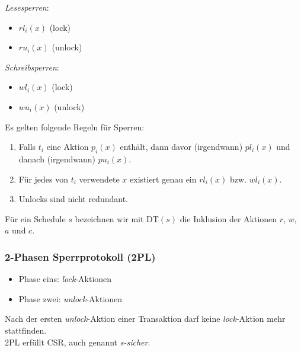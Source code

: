 \documentclass[a4paper,parskip=half*,DIV=15,fontsize=11pt]{scrartcl}
\begin{document}
\begin{minipage}[t]{0.5\textwidth}
\begin{center}
\emph{Lesesperren}:
\begin{itemize}
\item $rl_i(x)$ (lock)
\item $ru_i(x)$ (unlock)
\end{itemize}
\end{center}
\end{minipage}
\begin{minipage}[t]{0.5\textwidth}
\begin{center}
\emph{Schreibsperren}:
\begin{itemize}
\item $wl_i(x)$ (lock)
\item $wu_i(x)$ (unlock)
\end{itemize}
\end{center}
\end{minipage}
\smallskip

Es gelten folgende Regeln für Sperren:
\begin{enumerate}
\item Falls $t_i$ eine Aktion $p_i(x)$ enthält, dann davor (irgendwann) $pl_i(x)$ und danach (irgendwann) $pu_i(x)$.
\item Für jedes von $t_i$ verwendete $x$ existiert genau ein $rl_i(x)$ bzw. $wl_i(x)$.
\item Unlocks sind nicht redundant.
\end{enumerate}
Für ein Schedule $s$ bezeichnen wir mit DT$(s)$ die Inklusion der Aktionen $r$, $w$, $a$ und $c$.

\subsubsection*{2-Phasen Sperrprotokoll (2PL)}

\begin{minipage}[t]{0.45\textwidth}
\begin{itemize}
\item Phase eins: \emph{lock}-Aktionen
\item Phase zwei: \emph{unlock}-Aktionen
\end{itemize}
\end{minipage}
\hspace{0.1\textwidth}
\begin{minipage}[t]{0.45\textwidth}
Nach der ersten \emph{unlock}-Aktion einer Transaktion darf keine \emph{lock}-Aktion mehr stattfinden.\\
2PL erfüllt CSR, auch genannt \emph{s-sicher}.
\end{minipage}
\bigskip
\end{document}
